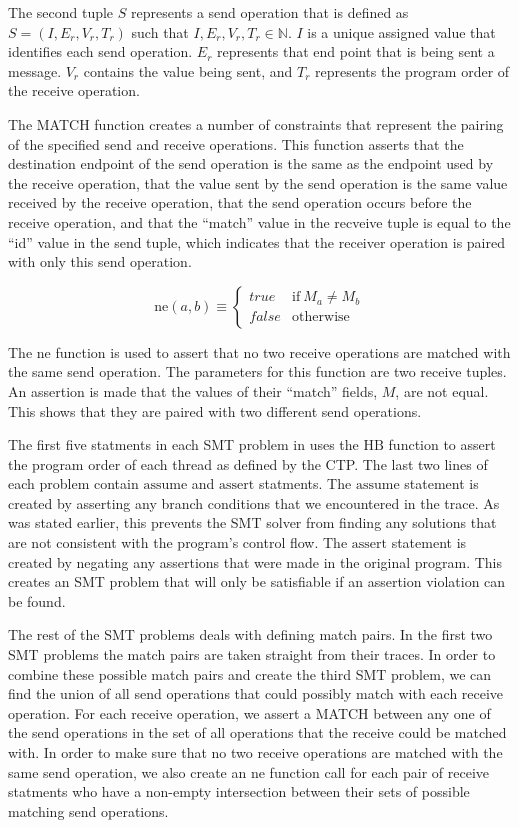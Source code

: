 The second tuple $S$ represents a send operation that is defined as $S =
(I,E_r,V_r,T_r)$ such that $I,E_r,V_r,T_r \in \mathbb{N}$. $I$ is a unique
assigned value that identifies each send operation. $E_r$ represents that end
point that is being sent a message. $V_r$ contains the value being sent, and
$T_r$ represents the program order of the receive operation.

The MATCH function creates a number of constraints that represent the pairing
of the specified send and receive operations. This function asserts that the
destination endpoint of the send operation is the same as the endpoint used by
the receive operation, that the value sent by the send operation is the same
value received by the receive operation, that the send operation occurs before
the receive operation, and that the ``match'' value in the recveive tuple is
equal to the ``id'' value in the send tuple, which indicates that the receiver
operation is paired with only this send operation.

\begin{equation}
\mathrm{ne}(a,b) \equiv \left\{ \begin{array}{rl}
  \mathit{true} & \mathrm{if}\ M_a \not = M_b \\
  \mathit{false} & \mathrm{otherwise}\ 
\end{array}
\right .
\end{equation}

The ne function is used to assert that no two receive operations are matched
with the same send operation. The parameters for this function are two receive
tuples. An assertion is made that the values of their ``match'' fields, $M$,
are not equal. This shows that they are paired with two different send
operations.

The first five statments in each SMT problem in  uses the
$\mathrm{HB}$ function to assert the program order of each thread as defined by
the CTP. The last two lines of each problem contain $\mathrm{assume}$ and
$\mathrm{assert}$ statments. The $\mathrm{assume}$ statement is created by
asserting any branch conditions that we encountered in the trace. As was stated
earlier, this prevents the SMT solver from finding any solutions that are not
consistent with the program's control flow. The $\mathrm{assert}$ statement is
created by negating any assertions that were made in the original program. This
creates an SMT problem that will only be satisfiable if an assertion violation
can be found.

The rest of the SMT problems deals with defining match pairs. In the first two
SMT problems the match pairs are taken straight from their traces. In order to
combine these possible match pairs and create the third SMT problem, we can
find the union of all send operations that could possibly match with each
receive operation. For each receive operation, we assert a MATCH between any
one of the send operations in the set of all operations that the receive could
be matched with. In order to make sure that no two receive operations are
matched with the same send operation, we also create an $\mathrm{ne}$ function
call for each pair of receive statments who have a non-empty intersection
between their sets of possible matching send operations. 

